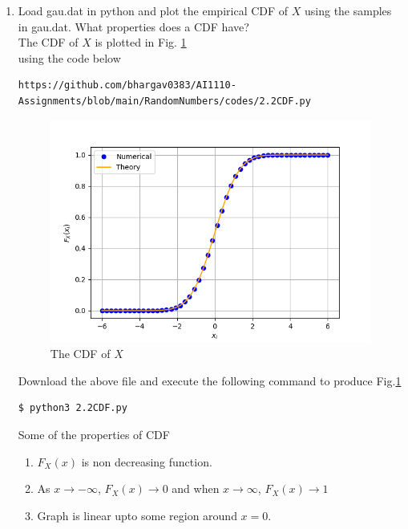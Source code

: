 \documentclass[journal,12pt,twocolumn]{IEEEtran}
\begin{document}
\begin{enumerate}[label=\thesection.\arabic*
,ref=\thesection.\theenumi]
\item
Load gau.dat in python and plot the empirical CDF of $X$ using the samples in gau.dat. What properties does a CDF have?\\
\solution The CDF of $X$ is plotted in Fig. \ref{fig:2.2}\\
using the code below
\begin{lstlisting}
https://github.com/bhargav0383/AI1110-Assignments/blob/main/RandomNumbers/codes/2.2CDF.py
\end{lstlisting}
\begin{figure}[!h]
\centering
\includegraphics[width=\columnwidth]{./figs/2.2CDF.png}
\caption{The CDF of $X$}
\label{fig:2.2}
\end{figure}
Download the above file and execute the following command to produce Fig.\ref{fig:2.2}
\begin{lstlisting}
$ python3 2.2CDF.py
\end{lstlisting}
Some of the properties of CDF 
\begin{enumerate}
    \item $F_X(x)$ is non decreasing function.
    \item As $x \to -\infty$, $F_X(x) \to 0$ and when $x \to \infty$, $F_X(x) \to 1$
    \item Graph is linear upto some region around $x=0$.
\end{enumerate}


\end{enumerate}
\end{document}
